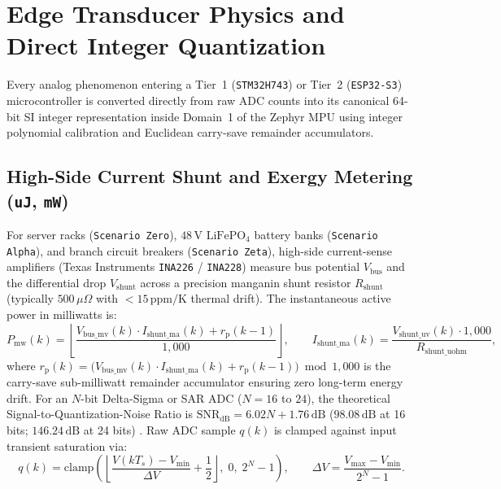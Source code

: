 \section{Edge Transducer Physics and Direct Integer Quantization}
\label{sec:l2-adc-transducer-physics}

Every analog phenomenon entering a Tier~1 (\texttt{STM32H743}) or Tier~2 (\texttt{ESP32-S3}) microcontroller is converted directly from raw ADC counts into its canonical 64-bit SI integer representation inside Domain~1 of the Zephyr MPU using integer polynomial calibration and Euclidean carry-save remainder accumulators.

\subsection{High-Side Current Shunt and Exergy Metering (\texttt{uJ}, \texttt{mW})}

For server racks (\texttt{Scenario Zero}), $48\,\mathrm{V}$ $\mathrm{LiFePO_4}$ battery banks (\texttt{Scenario Alpha}), and branch circuit breakers (\texttt{Scenario Zeta}), high-side current-sense amplifiers (Texas Instruments \texttt{INA226} / \texttt{INA228}) measure bus potential $V_{\mathrm{bus}}$ and the differential drop $V_{\mathrm{shunt}}$ across a precision manganin shunt resistor $R_{\mathrm{shunt}}$ (typically $500\,\mu\Omega$ with $< 15\,\mathrm{ppm/K}$ thermal drift). The instantaneous active power in milliwatts is:
\begin{equation}
    P_{\mathrm{mw}}(k) = \left\lfloor \frac{V_{\mathrm{bus\_mv}}(k) \cdot I_{\mathrm{shunt\_ma}}(k) + r_{\mathrm{p}}(k-1)}{1{,}000} \right\rfloor, \qquad I_{\mathrm{shunt\_ma}}(k) = \frac{V_{\mathrm{shunt\_uv}}(k) \cdot 1{,}000}{R_{\mathrm{shunt\_uohm}}},
    \label{eq:l2-shunt-power}
\end{equation}
where $r_{\mathrm{p}}(k) = \bigl(V_{\mathrm{bus\_mv}}(k) \cdot I_{\mathrm{shunt\_ma}}(k) + r_{\mathrm{p}}(k-1)\bigr) \bmod 1{,}000$ is the carry-save sub-milliwatt remainder accumulator ensuring zero long-term energy drift. For an $N$-bit Delta-Sigma or SAR ADC ($N = 16$ to $24$), the theoretical Signal-to-Quantization-Noise Ratio is $\mathrm{SNR}_{\mathrm{dB}} = 6.02 N + 1.76\,\mathrm{dB}$ ($98.08\,\mathrm{dB}$ at 16 bits; $146.24\,\mathrm{dB}$ at 24 bits) \parencite{kester2005data}. Raw ADC sample $q(k)$ is clamped against input transient saturation via:
\begin{equation}
    q(k) = \mathrm{clamp}\!\left( \left\lfloor \frac{V(k T_s) - V_{\min}}{\Delta V} + \frac{1}{2} \right\rfloor,\; 0,\; 2^N - 1 \right), \qquad \Delta V = \frac{V_{\max} - V_{\min}}{2^N - 1}.
    \label{eq:l2-adc-clamp}
\end{equation}

